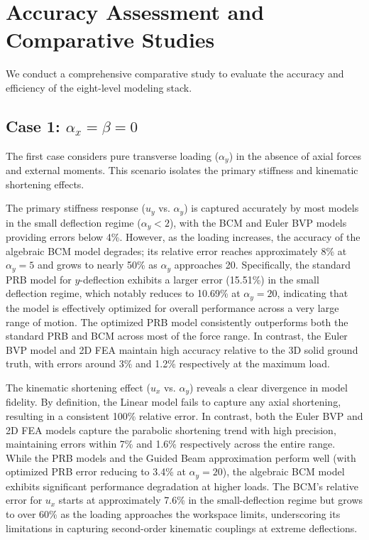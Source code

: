 \documentclass[colorlinks,upint,subscriptcorrection,varvw,hyphenate,balance]{asmeconf} %
\begin{document}
\section{Accuracy Assessment and Comparative Studies}
\label{sec:comparative_studies}
We conduct a comprehensive comparative study to evaluate the accuracy and efficiency of the eight-level modeling stack. 

\subsection{Case 1: \texorpdfstring{$\alpha_x = \beta = 0$}{alpha_x = beta = 0}}
The first case considers pure transverse loading ($\alpha_y$) in the absence of axial forces and external moments. This scenario isolates the primary stiffness and kinematic shortening effects. 

The primary stiffness response ($u_y$ vs. $\alpha_y$) is captured accurately by most models in the small deflection regime ($\alpha_y < 2$), with the BCM and Euler BVP models providing errors below 4\%. However, as the loading increases, the accuracy of the algebraic BCM model degrades; its relative error reaches approximately 8\% at $\alpha_y = 5$ and grows to nearly 50\% as $\alpha_y$ approaches 20. Specifically, the standard PRB model for $y$-deflection exhibits a larger error (15.51\%) in the small deflection regime, which notably reduces to 10.69\% at $\alpha_y = 20$, indicating that the model is effectively optimized for overall performance across a very large range of motion. The optimized PRB model consistently outperforms both the standard PRB and BCM across most of the force range. In contrast, the Euler BVP model and 2D FEA maintain high accuracy relative to the 3D solid ground truth, with errors around 3\% and 1.2\% respectively at the maximum load. 

The kinematic shortening effect ($u_x$ vs. $\alpha_y$) reveals a clear divergence in model fidelity. By definition, the Linear model fails to capture any axial shortening, resulting in a consistent 100\% relative error. In contrast, both the Euler BVP and 2D FEA models capture the parabolic shortening trend with high precision, maintaining errors within 7\% and 1.6\% respectively across the entire range. While the PRB models and the Guided Beam approximation perform well (with optimized PRB error reducing to 3.4\% at $\alpha_y = 20$), the algebraic BCM model exhibits significant performance degradation at higher loads. The BCM's relative error for $u_x$ starts at approximately 7.6\% in the small-deflection regime but grows to over 60\% as the loading approaches the workspace limits, underscoring its limitations in capturing second-order kinematic couplings at extreme deflections.
\end{document}
